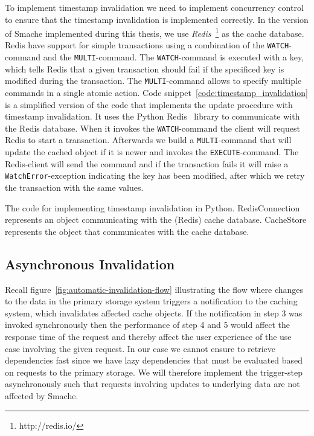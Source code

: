 To implement timestamp invalidation we need to implement concurrency control to ensure that the timestamp invalidation is implemented correctly. In the version of Smache implemented during this thesis, we use \emph{Redis}~\footnote{http://redis.io/} as the cache database. Redis have support for simple transactions using a combination of the \verb$WATCH$-command and the \verb$MULTI$-command. The \verb$WATCH$-command is executed with a key, which tells Redis that a given transaction should fail if the specificed key is modified during the transaction. The \verb$MULTI$-command allows to specify multiple commands in a single atomic action.
Code snippet~\ref{code:timestamp_invalidation} is a simplified version of the code that implements the update procedure with timestamp invalidation. It uses the Python Redis~\cite{docs:python-redis} library to communicate with the Redis database. When it invokes the \verb$WATCH$-command the client will request Redis to start a transaction. Afterwards we build a \verb$MULTI$-command that will update the cached object if it is newer and invokes the \verb$EXECUTE$-command. The Redis-client will send the command and if the transaction fails it will raise a \verb$WatchError$-exception indicating the key has been modified, after which we retry the transaction with the same values.

\begin{code}{The code for implementing timestamp invalidation in Python. RedisConnection represents an object communicating with the (Redis) cache database. CacheStore represents the object that communicates with the cache database.}
  
  \label{code:timestamp_invalidation}
\end{code}


\subsection{Asynchronous Invalidation}
\label{subsec:asynchronous-invalidation}

Recall figure~\ref{fig:automatic-invalidation-flow} illustrating the flow where changes to the data in the primary storage system triggers a notification to the caching system, which invalidates affected cache objects. If the notification in step 3 was invoked synchronously then the performance of step 4 and 5 would affect the response time of the request and thereby affect the user experience of the use case involving the given request. In our case we cannot ensure to retrieve dependencies fast since we have lazy dependencies that must be evaluated based on requests to the primary storage. We will therefore implement the trigger-step asynchronously such that requests involving updates to underlying data are not affected by Smache.

